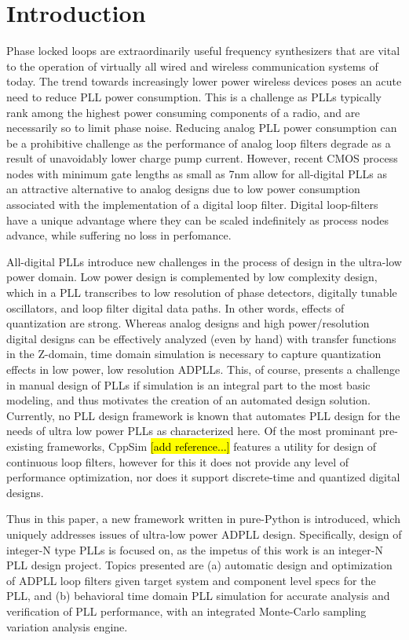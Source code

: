 \section{Introduction}\label{intro}
Phase locked loops are extraordinarily useful frequency synthesizers that are vital to the operation of virtually all wired and wireless communication systems of today. The trend towards increasingly lower power wireless devices poses an acute need to reduce PLL power consumption. This is a challenge as PLLs typically rank among the highest power consuming components of a radio, and are necessarily so to limit phase noise. Reducing analog PLL power consumption can be a prohibitive challenge as the performance of analog loop filters degrade as a result of unavoidably lower charge pump current. However, recent CMOS process nodes with minimum gate lengths as small as 7nm allow for all-digital PLLs as an attractive alternative to analog designs due to low power consumption associated with the implementation of a digital loop filter. Digital loop-filters have a unique advantage where they can be scaled indefinitely as process nodes advance, while suffering no loss in perfomance. 

All-digital PLLs introduce new challenges in the process of design in the ultra-low power domain. Low power design is complemented by low complexity design, which in a PLL transcribes to low resolution of phase detectors, digitally tunable oscillators, and loop filter digital data paths. In other words, effects of quantization are strong. Whereas analog designs and high power/resolution digital designs can be effectively analyzed (even by hand) with transfer functions in the Z-domain, time domain simulation is necessary to capture quantization effects in low power, low resolution ADPLLs. This, of course, presents a challenge in manual design of PLLs if simulation is an integral part to the most basic modeling, and thus motivates the creation of an automated design solution. Currently, no PLL design framework is known that automates PLL design for the needs of ultra low power PLLs as characterized here. Of the most prominant pre-existing frameworks, CppSim \hl{[add reference...]} features a utility for design of continuous loop filters, however for this it does not provide any level of performance optimization, nor does it support discrete-time and quantized digital designs. 

Thus in this paper, a new framework written in pure-Python is introduced, which uniquely addresses issues of ultra-low power ADPLL design. Specifically, design of integer-N type PLLs is focused on, as the impetus of this work is an integer-N PLL design project. Topics presented are (a) automatic design and optimization of ADPLL loop filters given target system and component level specs for the PLL, and (b) behavioral time domain PLL simulation for accurate analysis and verification of PLL performance, with an integrated Monte-Carlo sampling variation analysis engine.

